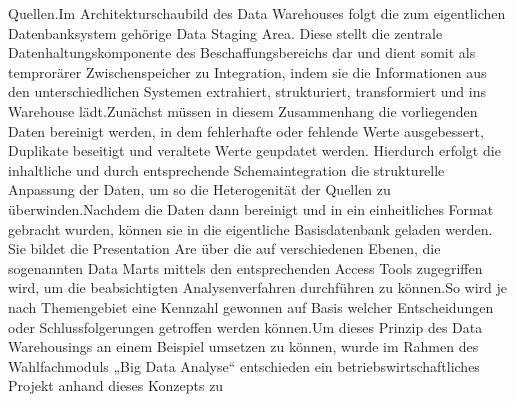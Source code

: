 \documentclass[sigconf]{acmart}
\begin{document}
Quellen.\newline Im  Architekturschaubild des Data Warehouses folgt die zum eigentlichen Datenbanksystem gehörige Data Staging Area. Diese stellt die zentrale Datenhaltungskomponente des Beschaffungsbereichs dar und dient somit als temprorärer Zwischenspeicher zu Integration, indem sie die Informationen aus den unterschiedlichen Systemen extrahiert, strukturiert, transformiert und ins Warehouse lädt.\newline Zunächst müssen in diesem Zusammenhang  die vorliegenden Daten bereinigt werden, in dem fehlerhafte oder fehlende Werte ausgebessert, Duplikate beseitigt und veraltete Werte geupdatet werden. Hierdurch erfolgt die inhaltliche und  durch entsprechende Schemaintegration die strukturelle Anpassung der Daten, um so die Heterogenität der Quellen zu überwinden.\newline Nachdem die Daten dann bereinigt und in ein einheitliches Format gebracht wurden, können sie in die eigentliche Basisdatenbank geladen werden. Sie bildet die Presentation Are über die auf verschiedenen Ebenen, die sogenannten Data Marts mittels den entsprechenden Access Tools zugegriffen wird, um die beabsichtigten Analysenverfahren durchführen zu können.\newline So wird je nach Themengebiet eine Kennzahl gewonnen auf Basis welcher Entscheidungen oder Schlussfolgerungen getroffen werden können.\newline Um dieses Prinzip des Data Warehousings an einem Beispiel umsetzen zu können, wurde im Rahmen des Wahlfachmoduls „Big Data Analyse“ entschieden ein betriebswirtschaftliches Projekt anhand dieses Konzepts zu 
\end{document}
